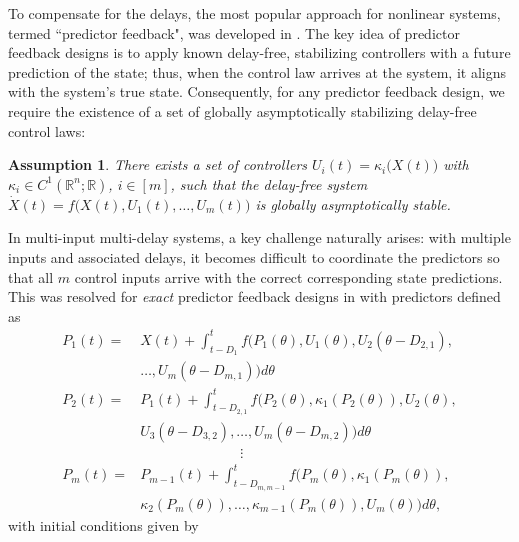 \documentclass[letterpaper, 10 pt, conference]{ieeeconf}  %
\newtheorem{assumption}[theorem]{Assumption}
\begin{document}
To compensate for the delays, the most popular approach for nonlinear systems, termed ``predictor feedback", was developed in \cite{Krstic:2010}. The key idea of predictor feedback designs is to apply known delay-free, stabilizing controllers with a future prediction of the state; thus, when the control law arrives at the system, it aligns with the system's true state. Consequently, for any predictor feedback design, we  require the existence of a set of globally asymptotically stabilizing delay-free control laws:
\begin{assumption}\label{assumption:delay-free-control-laws}
There exists a set of controllers $U_i(t) = \kappa_i \big( X(t)\big)$ with $\kappa_i \in C^1(\mathbb{R}^n;\mathbb{R})$, $i \in [m]$, such that the delay-free system $\dot{X}(t) = f \bigg( X(t), U_1(t), \dots, U_m(t) \bigg)$ is globally asymptotically stable.
\end{assumption}
\noindent In multi-input multi-delay systems, a key challenge naturally arises: with multiple inputs and associated delays, it becomes difficult to coordinate the predictors so that all $m$ control inputs arrive with the correct corresponding state predictions. This was resolved for \emph{exact} predictor feedback designs in \cite{Bekiaris-Liberis_Krstic:2016} with predictors defined as
\allowdisplaybreaks
\begin{subequations}\label{eqs:P_system}
    \begin{align}
        P_1(t) =& X(t) + \int_{t-D_1}^t f \bigg(P_1(\theta), U_1(\theta), U_2(\theta - D_{2,1}),\nonumber \\ 
        &   \dots, U_m(\theta-D_{m,1}) \bigg) d\theta \label{eq:P1(t)} \\
        P_2(t) =& P_1(t) + \int_{t-D_{2,1}}^t f \bigg( P_2(\theta), \kappa_1(P_2(\theta)), U_2(\theta), \nonumber \\& U_3(\theta - D_{3,2}),\dots, U_m(\theta-D_{m,2}) \bigg) d\theta \label{eq:P2(t)} \\
        &\hspace{3cm} \vdots \nonumber \\
        P_m(t) =& P_{m-1}(t) + \int_{t-D_{m,m-1}}^t f \bigg( P_m(\theta), \kappa_1(P_m(\theta)), \nonumber \\ & \kappa_2(P_m(\theta)), \dots, \kappa_{m-1}(P_m(\theta)), U_m(\theta) \bigg) d\theta, \label{eq:Pm(t)}
    \end{align}
\end{subequations}
\allowdisplaybreaks
with initial conditions given by 
\end{document}
